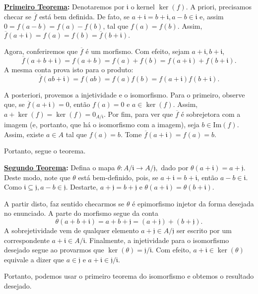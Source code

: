 \documentclass[algebraII_notes.tex]{subfiles}
\begin{document}
\begin{proof*}
	\textbf{\underline{Primeiro Teorema}:} Denotaremos por \(\mathfrak{i}\) o kernel \(\ker{(f)}.\)
	A priori, precisamos checar se \(\overline{f}\) está bem definida. De fato, se \(a+\mathfrak{i}=b+\mathfrak{i}, a-b\in \mathfrak{i}\) e, assim
	\(0 = f(a-b) = f(a)-f(b)\), tal que \(f(a) = f(b).\) Assim, \(\overline{f}(a+\mathfrak{i}) = f(a) = f(b) = \overline{f}(b+\mathfrak{i}).\)

	Agora, conferiremos que \(\overline{f}\) é um morfismo. Com efeito, sejam \(a+\mathfrak{i}, b+\mathfrak{i}\),
	\[
		\overline{f}(a+b+\mathfrak{i}) = f(a+b) = f(a)+f(b) = f(a+\mathfrak{i})+f(b+\mathfrak{i}).
	\]
	A mesma conta prova isto para o produto:
	\[
		\overline{f}(ab+\mathfrak{i}) = f(ab) = f(a)f(b) = f(a+\mathfrak{i})f(b+\mathfrak{i}).
	\]

	A posteriori, provemos a injetividade e o isomorfismo. Para o primeiro, observe que, se \(\overline{f}(a+\mathfrak{i}) = 0\), então
	\(f(a) = 0\) e \(a\in\ker{(f)}\). Assim, \(a+\ker{(f)} = \ker{(f)} = 0_{A/\mathfrak{i}}\). Por fim,
	para ver que \(\overline{f}\) é sobrejetora com a imagem (e, portanto, que há o isomorfismo com a imagem),
	seja \(b\in \mathrm{Im}(f).\) Assim, existe \(a\in A\) tal que \(f(a) = b\). Tome \(\overline{f}(a+\mathfrak{i}) = f(a)=b.\)

	Portanto, segue o teorema.

	\textbf{\underline{Segundo Teorema}:} Defina o mapa \(\theta :A/\mathfrak{i}\rightarrow A/\mathfrak{j},\) dado por \(\theta(a+\mathfrak{i}) = a + \mathfrak{j}.\)
	Deste modo, note que \(\theta \) está bem-definido, pois, se \(a+\mathfrak{i} = b+\mathfrak{i}\), então \(a-b\in \mathfrak{i}\). Como
	\(\mathfrak{i}\subseteq \mathfrak{j}, a-b\in \mathfrak{j}.\) Destarte, \(a+\mathfrak{j} = b+\mathfrak{j}\) e \(\theta(a+\mathfrak{i}) = \theta (b+\mathfrak{i}).\)

	A partir disto, faz sentido checarmos se \(\theta \) é epimorfismo injetor da forma desejada no enunciado. A parte do morfismo segue da conta
	\[
		\theta (a+b+\mathfrak{i}) = a + b + \mathfrak{j} = (a+\mathfrak{j}) + (b+\mathfrak{j}).
	\]
	A sobrejetividade vem de qualquer elemento \(a+\mathfrak{j}\in A/\mathfrak{j}\) ser escrito por um correspondente \(a+\mathfrak{i}\in A/\mathfrak{i}\).
	Finalmente, a injetividade para o isomorfismo desejado segue ao provarmos que \(\ker{(\theta )}=\mathfrak{j}/\mathfrak{i}.\) Com efeito,
	\(a+\mathfrak{i}\in\ker{(\theta )}\) equivale a dizer que \(a\in \mathfrak{j}\) e \(a+\mathfrak{i}\in \mathfrak{j}/\mathfrak{i}\).

	Portanto, podemos usar o primeiro teorema do isomorfismo e obtemos o resultado desejado. \qedsymbol
\end{proof*}
\end{document}
